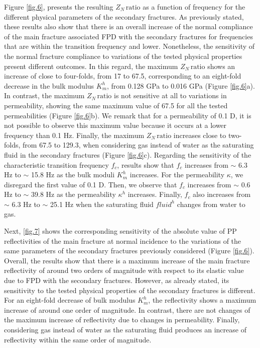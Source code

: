 \documentclass[draft]{agujournal2019}
\begin{document}
Figure \ref{fig.6}, presents the resulting $Z_N\, \text{ratio}$ as a function of frequency for the different physical parameters of the secondary fractures. As previously stated, these results also show that there is an overall increase of the normal compliance of the main fracture associated FPD with the secondary fractures for frequencies that are within the transition frequency and lower. Nonetheless, the sensitivity of the normal fracture compliance to variations of the tested physical properties present different outcomes. In this regard, the maximum  $Z_N\, \text{ratio}$ shows an increase 
of close to four-folds, from 17 to 67.5, corresponding to an eight-fold decrease in the bulk modulus $K_m^h$, from 0.128 GPa to 0.016 GPa (Figure \ref{fig.6}a). In contrast, the maximum  $Z_N\, \text{ratio}$ is not sensitive at all to variations in permeability, showing the same maximum value of 67.5 for all the tested permeabilities (Figure \ref{fig.6}b). We remark that for a permeability of 0.1 D, it is not possible to observe this maximum value because it occurs at a lower frequency than 0.1 Hz.
Finally, the maximum  $Z_N\, \text{ratio}$ increases close to two-folds, from 67.5 to 129.3, when considering gas instead of water as the saturating fluid in the secondary fractures (Figure \ref{fig.6}c). Regarding the sensitivity of the characteristic transition frequency $f_c$,  results show that $f_c$ increases from $\sim$ 6.3 Hz to $\sim$ 15.8 Hz as the bulk moduli $K_m^h$ increases. For the permeability $\kappa$, we disregard the first value of 0.1 D. Then, we observe that $f_c$ increases from $\sim$ 0.6 Hz to $\sim$  39.8 Hz as the permeability $\kappa^h$ increases. Finally, $f_c$ also increases from $\sim$ 6.3 Hz to $\sim$ 25.1 Hz when the saturating fluid $fluid^h$ changes from water to gas.


Next, \ref{fig.7} shows the corresponding sensitivity of the absolute value of PP reflectivities of the main fracture at normal incidence to the variations of the same parameters of the secondary fractures previously considered (Figure \ref{fig.6}). Overall, the results show that there is a maximum increase of the main fracture reflectivity of around two orders of magnitude with respect to its elastic value due to FPD with the secondary fractures. However, as already stated, its sensitivity to the tested physical 
properties of the secondary fractures is different. For an eight-fold decrease of bulk modulus $K_m^h$, the reflectivity shows a maximum increase of around one order of magnitude. In contrast, there are not changes of the maximum increase of reflectivity due to changes in permeability. Finally, considering gas instead of water as the saturating fluid produces an increase of reflectivity within the same order of magnitude.
\end{document}
